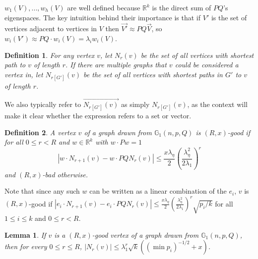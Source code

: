 \documentclass[11pt]{article}
\newcommand{\gss}{\mathbb{G}_1}
\newcommand{\1}{\mathbb{1}}
\newtheorem{lemma}{Lemma}
\newtheorem{definition}{Definition}
\begin{document}
$w_1(V), ...,w_h(V)$ are well defined because $\mathbb{R}^k$ is the direct sum of $PQ$'s eigenspaces. The key intuition behind their importance is that if $V'$ is the set of vertices adjacent to vertices in $V$ then $\overrightarrow{V'}\approx PQ\overrightarrow{V}$, so $w_i(V')\approx PQ\cdot w_i(V)=\lambda_iw_i(V)$.

\begin{definition}
For any vertex $v$, let $N_r(v)$ be the set of all vertices with shortest path to $v$ of length $r$. If there are multiple graphs that $v$ could be considered a vertex in, let $N_{r[G']}(v)$ be the set of all vertices with shortest paths in $G'$ to $v$ of length $r$.
\end{definition}
We also typically refer to $\overrightarrow{N_{r[G']}(v)}$ as simply $N_{r[G']}(v)$, as the context will make it clear whether the expression refers to a set or vector. 

\begin{definition}
A vertex $v$ of a graph drawn from $\gss(n,p,Q)$ is $(R,x)$-good if for all $0\le r<R$ and $w\in \mathbb{R}^k$ with $w\cdot Pw=1$ \[|w\cdot N_{r+1}(v)-w\cdot PQN_r(v)|\le \frac{x\lambda_{\eta}}{2}\left(\frac{\lambda_{\eta}^2}{2\lambda_1}\right)^{r}\] and $(R,x)$-bad otherwise.
\end{definition}

Note that since any such $w$ can be written as a linear combination of the $e_i$, $v$ is $(R,x)$-good if $|e_i\cdot N_{r+1}(v)-e_i\cdot PQN_r(v)|\le \frac{x\lambda_{\eta}}{2}\left(\frac{\lambda_{\eta}^2}{2\lambda_1}\right)^{r}\sqrt{p_i/k}$ for all $1\le i\le k$ and $0\le r<R$.

\begin{lemma}
If $v$ is a $(R,x)$-good vertex of a graph drawn from $\gss(n,p,Q)$, then for every $0\le r\le R$, $|N_r(v)|\le \lambda_1^r\sqrt{k}((\min p_i)^{-1/2}+x)$.
\end{lemma}
\end{document}
